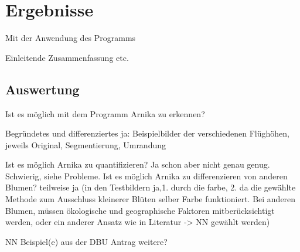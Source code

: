 \section{Ergebnisse}

Mit der Anwendung des Programms 





Einleitende Zusammenfassung etc.
\subsection{Auswertung}



Ist es möglich mit dem Programm Arnika zu erkennen? 




Begründetes und differenziertes ja: Beispielbilder der verschiedenen Flüghöhen, jeweils Original, Segmentierung, Umrandung




Ist es möglich Arnika zu quantifizieren? Ja schon aber nicht genau genug. Schwierig, siehe Probleme. 
Ist es möglich Arnika zu differenzieren von anderen Blumen? teilweise ja (in den Testbildern ja,1. durch die farbe, 2. da die gewählte Methode zum Ausschluss kleinerer Blüten selber Farbe funktioniert. Bei anderen Blumen, müssen ökologische und geographische Faktoren mitberücksichtigt werden, oder ein anderer Ansatz wie in Literatur -> NN gewählt werden)


NN Beispiel(e) aus der DBU Antrag
weitere?






